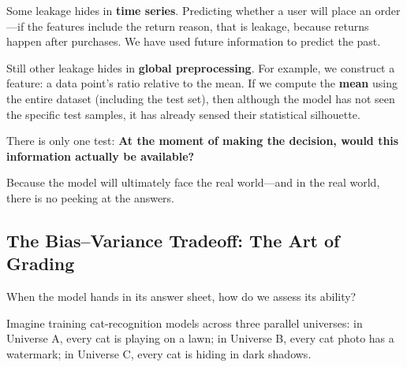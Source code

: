 Some leakage hides in \textbf{time series}. Predicting whether a user will place an order---if the features include the return reason, that is leakage, because returns happen after purchases. We have used future information to predict the past.

Still other leakage hides in \textbf{global preprocessing}. For example, we construct a feature: a data point's ratio relative to the mean. If we compute the \textbf{mean} using the entire dataset (including the test set), then although the model has not seen the specific test samples, it has already sensed their statistical silhouette.

\vspace{1em}

There is only one test: \textbf{At the moment of making the decision, would this information actually be available?}

Because the model will ultimately face the real world---and in the real world, there is no peeking at the answers.

\subsection{The Bias--Variance Tradeoff: The Art of Grading}

When the model hands in its answer sheet, how do we assess its ability?







Imagine training cat-recognition models across three parallel universes: in Universe A, every cat is playing on a lawn; in Universe B, every cat photo has a watermark; in Universe C, every cat is hiding in dark shadows.

